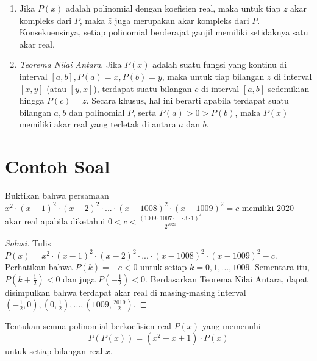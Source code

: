 \documentclass[11pt]{scrartcl}
\begin{document}
\begin{enumerate}
    \item Jika $P(x)$ adalah polinomial dengan koefisien real, maka untuk tiap $z$ akar kompleks dari $P$, maka $\bar{z}$ juga merupakan akar kompleks dari $P$. Konsekuensinya, setiap polinomial berderajat ganjil memiliki setidaknya satu akar real.
    \item \textit{Teorema Nilai Antara}. Jika $P(x)$ adalah suatu fungsi yang kontinu di interval $[a,b], P(a) = x, P(b) = y$, maka untuk tiap bilangan $z$ di interval $[x,y]$ (atau $[y,x]$), terdapat suatu bilangan $c$ di interval $[a,b]$ sedemikian hingga $P(c) = z$. Secara khusus, hal ini berarti apabila terdapat suatu bilangan $a,b$ dan polinomial $P$, serta $P(a)>0>P(b)$, maka $P(x)$ memiliki akar real yang terletak di antara $a$ dan $b$.
\end{enumerate}

\section{Contoh Soal}
\begin{example}
    [Norwegia MO 2020] Buktikan bahwa persamaan $x^2 \cdot (x - 1)^2 \cdot (x - 2)^2 \cdot ... \cdot (x -  1008)^2 \cdot (x- 1009)^2 =  c$ memiliki $2020$ akar real apabila diketahui $0 < c <\frac{(1009 \cdot1007 \cdot  ... \cdot 3\cdot 1)^4}{2^{2020}}$
\end{example}

\begin{proof}[Solusi]
    Tulis $P(x) = x^2 \cdot (x - 1)^2 \cdot (x - 2)^2 \cdot ... \cdot (x -  1008)^2 \cdot (x- 1009)^2 - c$. Perhatikan bahwa $P(k) = -c < 0$ untuk setiap $k = 0, 1, ..., 1009$. Sementara itu, $P\left(k + \frac{1}{2}\right) < 0$ dan juga $P\left(-\frac{1}{2}\right) < 0$. Berdasarkan Teorema Nilai Antara, dapat disimpulkan bahwa terdapat akar real di masing-masing interval $(-\frac{1}{2}, 0), (0, \frac{1}{2}), ..., (1009, \frac{2019}{2})$.
\end{proof}

\begin{example}
    [Azerbaijan MO 2015] Tentukan semua polinomial berkoefisien real $P(x)$ yang memenuhi $$P(P(x))=(x^2+x+1)\cdot P(x)$$ untuk setiap bilangan real $x$.
\end{example}
\end{document}
